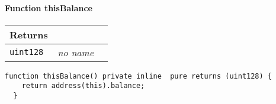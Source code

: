 \paragraph{Function thisBalance}


\ifsoltables
\noindent\begin{tabular}{|l|l|p{5cm}|}\hline
\multicolumn{3}{|l|}{\bf Returns}\\\hline
\tt uint128 & {\em no name} &\\\hline
\end{tabular}
\fi

\vspace{2cm}

\begin{lstlisting}[firstnumber=346]
  function thisBalance() private inline  pure returns (uint128) {
    return address(this).balance;
  }
\end{lstlisting}
